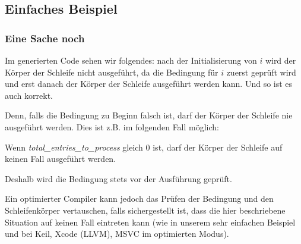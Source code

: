 \subsection{Einfaches Beispiel}





\subsubsection{Eine Sache noch}
Im generierten Code sehen wir folgendes:
nach der Initialisierung von $i$ wird der Körper der Schleife nicht ausgeführt,
da die Bedingung für $i$ zuerst geprüft wird und erst danach der Körper der
Schleife ausgeführt werden kann. Und so ist es auch korrekt.

Denn, falls die Bedingung zu Beginn falsch ist, darf der Körper der Schleife nie
ausgeführt werden. 
Dies ist z.B. im folgenden Fall möglich:




Wenn \emph{total\_entries\_to\_process} gleich 0 ist, darf der Körper der Schleife
auf keinen Fall ausgeführt werden. 

Deshalb wird die Bedingung stets vor der Ausführung geprüft. 

Ein optimierter Compiler kann jedoch das Prüfen der Bedingung und den
Schleifenkörper vertauschen, falls sichergestellt ist, dass die hier
beschriebene Situation auf keinen Fall eintreten kann (wie in unserem sehr
einfachen Beispiel und bei Keil, Xcode (LLVM), MSVC im optimierten Modus).

